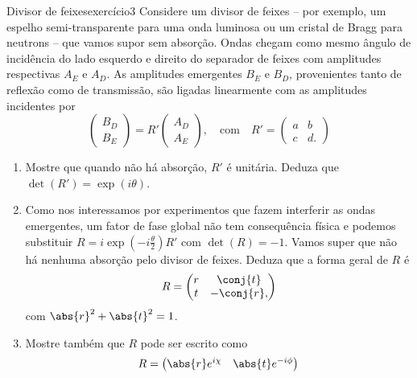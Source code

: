 \begin{exercício}{Divisor de feixes}{exercício3}
    Considere um divisor de feixes -- por exemplo, um espelho semi-transparente para uma onda luminosa ou um cristal de Bragg para neutrons -- que vamos supor sem absorção. Ondas chegam como mesmo ângulo de incidência do lado esquerdo e direito do separador de feixes com amplitudes respectivas \(A_E\) e \(A_D\). As amplitudes emergentes \(B_E\) e \(B_D\), provenientes tanto de reflexão como de transmissão, são ligadas linearmente com as amplitudes incidentes por
    \begin{equation*}
        \begin{pmatrix}
            B_D \\ B_E
        \end{pmatrix}
        = R' \begin{pmatrix}
            A_D \\ A_E
        \end{pmatrix},\quad\text{com}\quad
        R' = \begin{pmatrix}
            a & b\\c & d.
        \end{pmatrix}
    \end{equation*}
    \begin{enumerate}[label=(\alph*)]
        \item Mostre que quando não há absorção, \(R'\) é unitária. Deduza que \(\det(R') = \exp(i\theta)\).
        \item Como nos interessamos por experimentos que fazem interferir as ondas emergentes, um fator de fase global não tem consequência física e podemos substituir \(R = i \exp\left(-i\frac\theta2\right)R'\) com \(\det(R) = -1\). Vamos super que não há nenhuma absorção pelo divisor de feixes. Deduza que a forma geral de \(R\) é
            \begin{equation*}
                R = \begin{pmatrix}
                    r & \conj{t} \\
                    t & -\conj{r},
                \end{pmatrix}
            \end{equation*}
            com \(\abs{r}^2 + \abs{t}^2 = 1\).
        \item Mostre também que \(R\) pode ser escrito como
            \begin{equation*}
                R = \begin{pmatrix}
                    \abs{r}e^{i\chi} & \abs{t} e^{-i\phi}\\

\end{pmatrix}
\end{equation*}
\end{enumerate}
\end{exercício}
